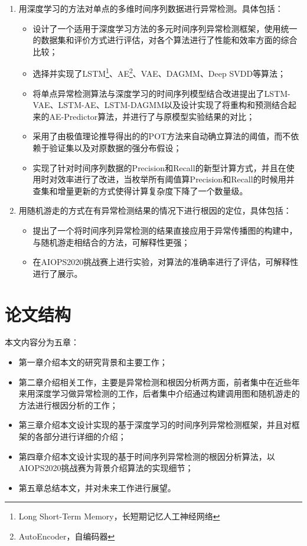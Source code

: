 \begin{enumerate}
    \item 用深度学习的方法对单点的多维时间序列数据进行异常检测。具体包括：
        \begin{itemize}
        \item 设计了一个适用于深度学习方法的多元时间序列异常检测框架，使用统一的数据集和评价方式进行评估，对各个算法进行了性能和效率方面的综合比较；
        \item 选择并实现了LSTM\footnote{Long Short-Term Memory，长短期记忆人工神经网络}、AE\footnote{AutoEncoder，自编码器}、VAE\cite{an2015variational}、DAGMM\cite{zong2018deep}、Deep SVDD\cite{ruff2018deep}等算法；
        \item 将单点异常检测算法与深度学习的时间序列模型结合改进提出了LSTM-VAE、LSTM-AE、LSTM-DAGMM以及设计实现了将重构和预测结合起来的AE-Predictor算法，并进行了与原模型实验结果的对比；
        \item 采用了由极值理论推导得出的的POT\cite{siffer2017anomaly}方法来自动确立算法的阈值，而不依赖于验证集以及对原数据的强分布假设；
        \item 实现了针对时间序列数据的Precision和Recall的新型计算方式\cite{tatbul2018precision}，并且在使用时对效率进行了改进，当枚举所有阈值算Precision和Recall的时候用并查集和增量更新的方式使得计算复杂度下降了一个数量级。
        \end{itemize}
    \item 用随机游走的方式在有异常检测结果的情况下进行根因的定位，具体包括：
        \begin{itemize}
        \item 提出了一个将时间序列异常检测的结果直接应用于异常传播图的构建中，与随机游走相结合的方法，可解释性更强；
        \item 在AIOPS2020挑战赛上进行实验，对算法的准确率进行了评估，可解释性进行了展示。
        \end{itemize}
\end{enumerate}
\section{论文结构}
本文内容分为五章：
\begin{itemize}
    \item 第一章介绍本文的研究背景和主要工作；
    \item 第二章介绍相关工作，主要是异常检测和根因分析两方面，前者集中在近些年来用深度学习做异常检测的工作，后者集中介绍通过构建调用图和随机游走的方法进行根因分析的工作；
    \item 第三章介绍本文设计实现的基于深度学习的时间序列异常检测框架，并且对框架的各部分进行详细的介绍；
    \item 第四章介绍本文设计实现的基于时间序列异常检测的根因分析算法，以AIOPS2020挑战赛为背景介绍算法的实现细节；
    \item 第五章总结本文，并对未来工作进行展望。
\end{itemize}